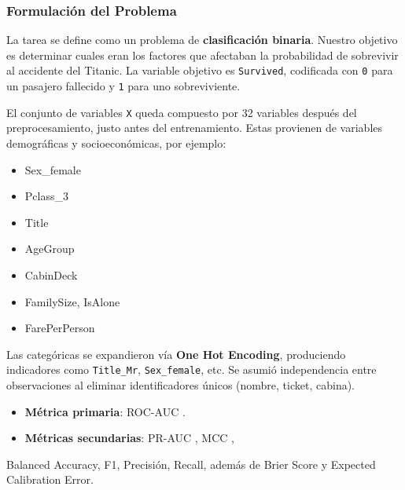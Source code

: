 \documentclass[conference]{IEEEtran}
\begin{document}
\subsubsection{Formulación del Problema}
\label{sec:org4c305d1}
La tarea se define como un problema de \textbf{clasificación binaria}. Nuestro objetivo es
determinar cuales eran los factores que afectaban la probabilidad de sobrevivir al
accidente del Titanic.  La variable objetivo es \texttt{Survived}, codificada con \texttt{0} para un
pasajero fallecido y \texttt{1} para uno sobreviviente.

El conjunto de variables \texttt{X} queda compuesto por 32 variables después del
preprocesamiento, justo antes del entrenamiento.  Estas provienen de variables
demográficas y socioeconómicas, por ejemplo:

\begin{itemize}
\item Sex\_female
\item Pclass\_3
\item Title
\item AgeGroup
\item CabinDeck
\item FamilySize, IsAlone
\item FarePerPerson
\end{itemize}

Las categóricas se expandieron vía \textbf{One Hot Encoding}, produciendo indicadores como
\texttt{Title\_Mr}, \texttt{Sex\_female}, etc. Se asumió independencia entre observaciones al
eliminar identificadores únicos (nombre, ticket, cabina).

\begin{itemize}
\item \textbf{Métrica primaria}: ROC-AUC \autocite{fawcett2006roc}.
\item \textbf{Métricas secundarias}: PR-AUC \autocite{Saito2015prauc}, MCC \autocite{chicco2020mcc},
\end{itemize}
Balanced Accuracy, F1, Precisión, Recall, además de Brier Score \autocite{brier1950brier} y
Expected Calibration Error.
\end{document}
